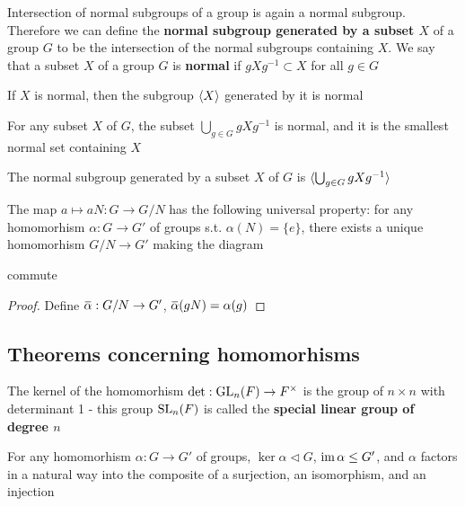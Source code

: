 \documentclass[11pt]{article}
\begin{document}
Intersection of normal subgroups of a group is again a normal subgroup. Therefore we can define
the \textbf{normal subgroup generated by a subset \(X\)} of a group \(G\) to be the intersection of the
normal subgroups containing \(X\). We say that a subset \(X\) of a group \(G\) is \textbf{normal}
if \(gXg^{-1}\subset X\) for all \(g\in G\)

\begin{lemma}[]
If \(X\) is normal, then the subgroup \(\langle X\rangle\) generated by it is normal
\end{lemma}

\begin{lemma}[]
For any subset \(X\) of \(G\), the subset \(\bigcup_{g\in G}gXg^{-1}\) is normal, and it is the smallest
normal set containing \(X\)
\end{lemma}

\begin{proposition}[]
The normal subgroup generated by a subset \(X\) of \(G\) is \(\langle\bigcup_{g\in G}gXg^{-1}\rangle\)
\end{proposition}

\begin{proposition}[]
The map \(a\mapsto aN:G\to G/N\) has the following universal property: for any homomorhism \(\alpha:G\to G'\)
of groups s.t. \(\alpha(N)=\{e\}\), there exists a unique homomorhism \(G/N\to G'\) making the diagram
\begin{center}\end{center}
commute
\end{proposition}

\begin{proof}
Define \(\baralpha:G/N\to G'\), \(\baralpha(gN)=\alpha(g)\)
\end{proof}
\subsection{Theorems concerning homomorhisms}
\label{sec:org05c218b}
The kernel of the homomorhism \(\det:\operatorname{GL}_n(F)\to F^{\times}\) is the group of \(n\times n\) with determinant
1 - this group \(\operatorname{SL}_n(F)\) is called the \textbf{special linear group of degree \(n\)}

\begin{theorem}
For any homomorhism \(\alpha:G\to G'\) of groups, \(\ker\alpha\lhd G\), \(\operatorname{im}\alpha\le G'\), and \(\alpha\) factors in a
natural way into the composite of a surjection, an isomorphism, and an injection
\begin{center}\end{center}
\end{theorem}
\end{document}
